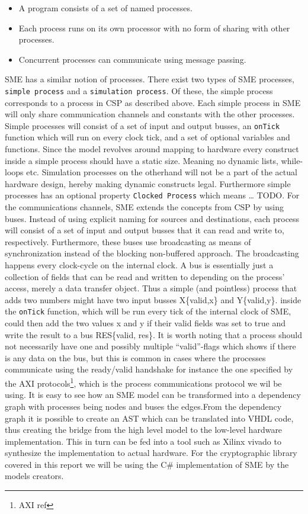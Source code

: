\documentclass[a4paper]{article}
\begin{document}
\begin{itemize}
\item A program consists of a set of named processes.
\item Each process runs on its own processor with no form of sharing with other processes.
\item Concurrent processes can communicate using message passing.
\end{itemize}

SME has a similar notion of processes. There exist two types of SME processes, \texttt{simple process} and a \texttt{simulation process}. Of these, the simple process corresponds to a process in CSP as described above. Each simple process in SME will only share communication channels and constants with the other processes. Simple processes will consist of a set of input and output busses, an \texttt{onTick} function which will run on every clock tick, and a set of optional variables and functions. Since the model revolves around mapping to hardware every construct inside a simple process should have a static size. Meaning no dynamic lists, while-loops etc. Simulation processes on the otherhand will not be a part of the actual hardware design, hereby making dynamic constructs legal. Furthermore simple processes has an optional property \texttt{Clocked Process} which means \ldots{} TODO.
For the communications channels, SME extends the concepts from CSP by using buses. Instead of using explicit naming for sources and destinations, each process will consist of a set of input and output busses that it can read and write to, respectively. Furthermore, these buses use broadcasting as means of synchronization instead of the blocking non-buffered approach.  The broadcasting happens every clock-cycle on the internal clock.
A bus is essentially just a collection of fields that can be read and written to depending on the process' access, merely a data transfer object. Thus a simple (and pointless) process that adds two numbers might have two input busses X\{valid,x\} and Y\{valid,y\}. inside the \texttt{onTick} function, which will be run every tick of the internal clock of SME, could then add the two values x and y if their valid fields was set to true and write the result to a bus RES\{valid, res\}. It is worth noting that a process should not necessarily have one and possibly multiple ``valid''-flags which shows if there is any data on the bus, but this is common in cases where the processes communicate using the ready/valid handshake for instance the one specified by the AXI protocols\footnote{AXI ref}, which is the process communications protocol we wil be using. It is easy to see how an SME model can be transformed into a dependency graph with processes being nodes and buses the edges.From the dependency graph it is possible to create an AST which can be translated into VHDL code\cite{SME}, thus creating the bridge from the high level model to the low-level hardware implementation. This in turn can be fed into a tool such as Xilinx vivado to synthesize the implementation to actual hardware. For the cryptographic library covered in this report we will be using the C\# implementation of SME by the models creators\cite{SME}.
\end{document}
